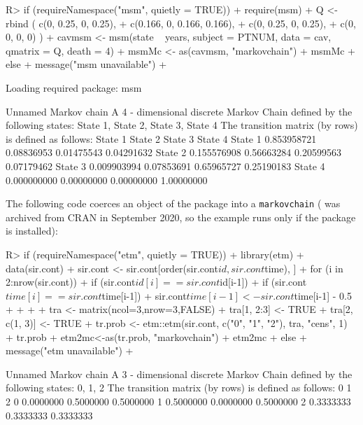 \documentclass[
  nojss]{jss}
\begin{document}
\begin{CodeChunk}
\begin{CodeInput}
R> if (requireNamespace("msm", quietly = TRUE)) {
+ require(msm)
+ Q <- rbind ( c(0, 0.25, 0, 0.25),
+              c(0.166, 0, 0.166, 0.166),
+              c(0, 0.25, 0, 0.25),
+              c(0, 0, 0, 0) )
+ cavmsm <- msm(state ~ years, subject = PTNUM, data = cav, qmatrix = Q, death = 4)
+ msmMc <- as(cavmsm, "markovchain")
+ msmMc
+   } else {
+   message("msm unavailable")
+   }
\end{CodeInput}
\begin{CodeOutput}
Loading required package: msm
\end{CodeOutput}
\begin{CodeOutput}
Unnamed Markov chain 
 A  4 - dimensional discrete Markov Chain defined by the following states: 
 State 1, State 2, State 3, State 4 
 The transition matrix  (by rows)  is defined as follows: 
            State 1    State 2    State 3    State 4
State 1 0.853958721 0.08836953 0.01475543 0.04291632
State 2 0.155576908 0.56663284 0.20599563 0.07179462
State 3 0.009903994 0.07853691 0.65965727 0.25190183
State 4 0.000000000 0.00000000 0.00000000 1.00000000
\end{CodeOutput}
\end{CodeChunk}

The following code coerces an object of the  package into a \texttt{markovchain} ( was archived from CRAN in September 2020, so the example runs only if the package is installed):

\begin{CodeChunk}
\begin{CodeInput}
R> if (requireNamespace("etm", quietly = TRUE)) {
+ library(etm)
+ data(sir.cont)
+ sir.cont <- sir.cont[order(sir.cont$id, sir.cont$time), ]
+ for (i in 2:nrow(sir.cont)) {
+   if (sir.cont$id[i]==sir.cont$id[i-1]) {
+     if (sir.cont$time[i]==sir.cont$time[i-1]) {
+       sir.cont$time[i-1] <- sir.cont$time[i-1] - 0.5
+     }
+   }
+ }
+ tra <- matrix(ncol=3,nrow=3,FALSE)
+ tra[1, 2:3] <- TRUE
+ tra[2, c(1, 3)] <- TRUE
+ tr.prob <- etm::etm(sir.cont, c("0", "1", "2"), tra, "cens", 1)
+ tr.prob
+ etm2mc<-as(tr.prob, "markovchain")
+ etm2mc
+   } else {
+   message("etm unavailable")
+ }
\end{CodeInput}
\begin{CodeOutput}
Unnamed Markov chain 
 A  3 - dimensional discrete Markov Chain defined by the following states: 
 0, 1, 2 
 The transition matrix  (by rows)  is defined as follows: 
          0         1         2
0 0.0000000 0.5000000 0.5000000
1 0.5000000 0.0000000 0.5000000
2 0.3333333 0.3333333 0.3333333
\end{CodeOutput}
\end{CodeChunk}
\end{document}
